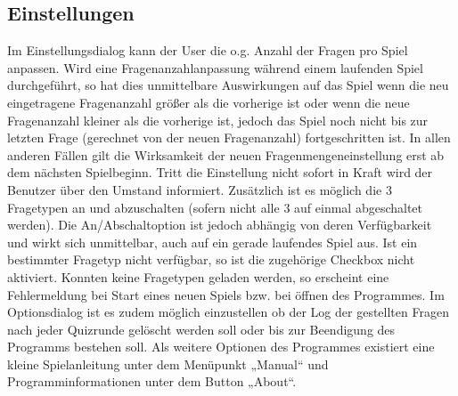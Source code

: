 \documentclass[10pt,a4paper,titlepage]{article}
\begin{document}
\subsection{Einstellungen}
Im Einstellungsdialog kann der User die o.g. Anzahl der Fragen pro Spiel anpassen.
Wird eine Fragenanzahlanpassung während einem laufenden Spiel durchgeführt, so hat dies unmittelbare Auswirkungen auf das Spiel wenn die neu eingetragene Fragenanzahl größer als die vorherige ist oder wenn die neue Fragenanzahl kleiner als die vorherige ist, jedoch das Spiel noch nicht bis zur letzten Frage (gerechnet von der neuen Fragenanzahl) fortgeschritten ist.
In allen anderen Fällen gilt die Wirksamkeit der neuen Fragenmengeneinstellung erst ab dem nächsten Spielbeginn.
Tritt die Einstellung nicht sofort in Kraft wird der Benutzer über den Umstand informiert.
Zusätzlich ist es möglich die 3 Fragetypen an und abzuschalten (sofern nicht alle 3 auf einmal abgeschaltet werden).
Die An/Abschaltoption ist jedoch abhängig von deren Verfügbarkeit und wirkt sich unmittelbar, auch auf ein gerade laufendes Spiel aus.
Ist ein bestimmter Fragetyp nicht verfügbar, so ist die zugehörige Checkbox nicht aktiviert. 
Konnten keine Fragetypen geladen werden, so erscheint eine Fehlermeldung bei Start eines neuen Spiels bzw. bei öffnen des Programmes.
Im Optionsdialog ist es zudem möglich einzustellen ob der Log der gestellten Fragen nach jeder Quizrunde gelöscht werden soll oder bis zur Beendigung des Programms bestehen soll.
Als weitere Optionen des Programmes existiert eine kleine Spielanleitung unter dem Menüpunkt „Manual“ und Programminformationen unter dem Button „About“.
\end{document}
